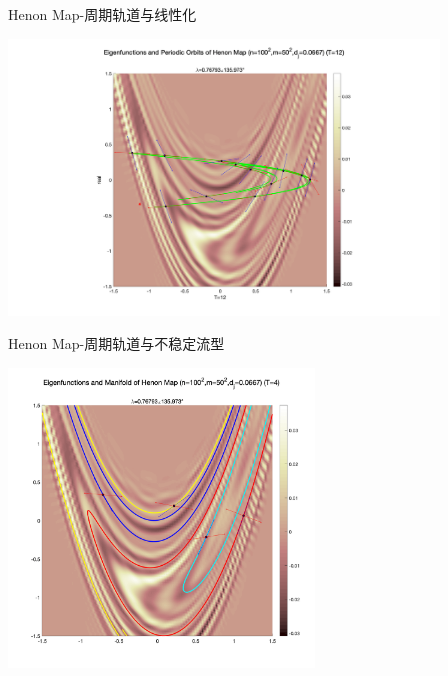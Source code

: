 \documentclass{beamer}
\begin{document}
    \begin{frame}{Henon Map-周期轨道与线性化}
    	\centerline{\includegraphics[width=4.5in]{images/Henon_eigen_Gauss_period1_n100m50T12.png}}
    \end{frame}
	 \begin{frame}{Henon Map-周期轨道与不稳定流型}
		\centerline{\includegraphics[width=3.2in]{images/Henon_eigen_Gauss_manifold_n100m50T4.png}}
	\end{frame}
\end{document}
